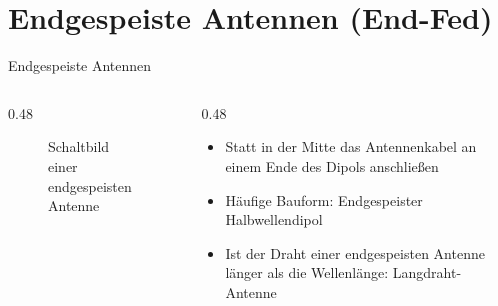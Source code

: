 \section{Endgespeiste Antennen (End-Fed)}
\label{section:endgespeiste_antennen}
\begin{frame}{Endgespeiste Antennen}
    \begin{columns}
        \begin{column}{0.48\linewidth}
            \begin{figure}
                \caption{\scriptsize Schaltbild einer endgespeisten Antenne}
                \label{n_antennenformen_schaltbild_endfed}
            \end{figure}
        \end{column}
        \begin{column}{0.48\linewidth}
            \begin{itemize}
                \item Statt in der Mitte das Antennenkabel an einem Ende des Dipols anschließen
                \item Häufige Bauform: Endgespeister Halbwellendipol
                \item Ist der Draht einer endgespeisten Antenne länger als die Wellenlänge: Langdraht-Antenne
            \end{itemize}
        \end{column}
    \end{columns}
\end{frame}

\begin{frame}
\end{frame}


